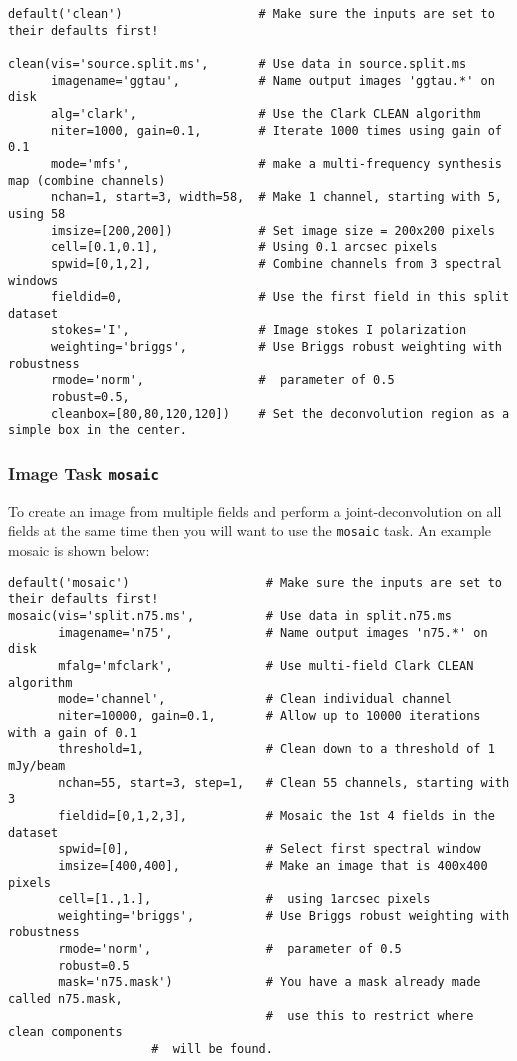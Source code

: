 \small
\begin{verbatim}
default('clean')                   # Make sure the inputs are set to their defaults first!

clean(vis='source.split.ms',       # Use data in source.split.ms
      imagename='ggtau',           # Name output images 'ggtau.*' on disk
      alg='clark',                 # Use the Clark CLEAN algorithm
      niter=1000, gain=0.1,        # Iterate 1000 times using gain of 0.1
      mode='mfs',                  # make a multi-frequency synthesis map (combine channels)
      nchan=1, start=3, width=58,  # Make 1 channel, starting with 5, using 58
      imsize=[200,200])            # Set image size = 200x200 pixels
      cell=[0.1,0.1],              # Using 0.1 arcsec pixels
      spwid=[0,1,2],               # Combine channels from 3 spectral windows
      fieldid=0,                   # Use the first field in this split dataset
      stokes='I',                  # Image stokes I polarization
      weighting='briggs',          # Use Briggs robust weighting with robustness
      rmode='norm',                #  parameter of 0.5
      robust=0.5,
      cleanbox=[80,80,120,120])    # Set the deconvolution region as a simple box in the center. 
\end{verbatim}
\normalsize

\subsubsection{Image Task {\tt mosaic}}

To create an image from multiple fields and perform a
joint-deconvolution on all fields at the same time then you will want
to use the {\tt mosaic} task.  An example mosaic is shown below: 

\small
\begin{verbatim}
default('mosaic')                   # Make sure the inputs are set to their defaults first!
mosaic(vis='split.n75.ms',          # Use data in split.n75.ms
       imagename='n75',             # Name output images 'n75.*' on disk
       mfalg='mfclark',             # Use multi-field Clark CLEAN algorithm
       mode='channel',              # Clean individual channel
       niter=10000, gain=0.1,       # Allow up to 10000 iterations with a gain of 0.1
       threshold=1,                 # Clean down to a threshold of 1 mJy/beam
       nchan=55, start=3, step=1,   # Clean 55 channels, starting with 3
       fieldid=[0,1,2,3],           # Mosaic the 1st 4 fields in the dataset
       spwid=[0],                   # Select first spectral window
       imsize=[400,400],            # Make an image that is 400x400 pixels
       cell=[1.,1.],                #  using 1arcsec pixels
       weighting='briggs',          # Use Briggs robust weighting with robustness
       rmode='norm',                #  parameter of 0.5
       robust=0.5
       mask='n75.mask')             # You have a mask already made called n75.mask,
                                    #  use this to restrict where clean components 
				    #  will be found. 
\end{verbatim}
\normalsize

